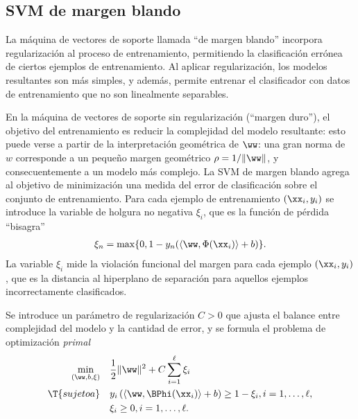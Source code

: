 %
%
\subsection{SVM de margen blando}
%
La máquina de vectores de soporte llamada ``de margen blando''
incorpora regularización al proceso de entrenamiento, permitiendo la
clasificación errónea de ciertos ejemplos de entrenamiento.  Al
aplicar regularización, los modelos resultantes son más simples, y
además, permite entrenar el clasificador con datos de entrenamiento
que no son linealmente separables.

En la máquina de vectores de soporte sin regularización (``margen
duro''), el objetivo del entrenamiento es reducir la complejidad del
modelo resultante: esto puede verse a partir de la interpretación
geométrica de $\ww$: una gran norma de $w$ corresponde a un pequeño
margen geométrico $\rho=1/\|\ww\|$, y consecuentemente a un modelo más
complejo.  La SVM de margen blando agrega al objetivo de minimización
una medida del error de clasificación sobre el conjunto de
entrenamiento.  Para cada ejemplo de entrenamiento $(\xx_i,y_i)$ se
introduce la variable de holgura no negativa $\xi_i$, que es la
función de pérdida ``bisagra''
%
\begin{align}
  \xi_n = \max\{0,1-y_n(\langle{}\ww,\Phi(\xx_i)\rangle+b)\}.
\end{align}
%
La variable $\xi_i$ mide la violación funcional del margen para cada
ejemplo $(\xx_i,y_i)$, que es la distancia al hiperplano de separación
para aquellos ejemplos incorrectamente clasificados.

Se introduce un parámetro de regularización $C>0$ que ajusta el
balance entre complejidad del modelo y la cantidad de error, y se
formula el problema de optimización \emph{primal}
%
\begin{align}
  \label{svm-primal-blando}
  \begin{split}
    \min_{(\ww,b,\xi)} \quad & \frac{1}{2}\|\ww\|^2+C\sum_{i=1}^{\ell}\xi_i\\
    \T{sujeto a} \quad &
    y_i\left(\langle{}\ww,\BPhi(\xx_i)\rangle+b\right) \geq 1-\xi_i, i=1,\ldots,\ell, \\
    & \xi_i \geq 0, i=1,\ldots,\ell.
  \end{split}
\end{align}
%


